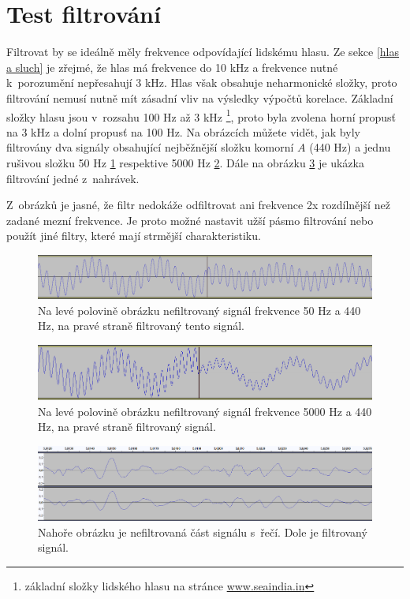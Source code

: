 \section{Test filtrování}
\label{testfilt}
Filtrovat by se ideálně měly frekvence odpovídající lidskému hlasu. Ze sekce \ref{hlas a sluch} je zřejmé, že hlas má frekvence do 10 kHz a frekvence nutné k~porozumění nepřesahují 3 kHz. Hlas však obsahuje neharmonické složky, proto filtrování nemusí nutně mít zásadní vliv na výsledky výpočtů korelace. Základní složky hlasu jsou v~rozsahu 100 Hz až 3 kHz \footnote{základní složky lidského hlasu na stránce \href{https://www.seaindia.in/human-voice-frequency-range/}{www.seaindia.in}}, proto byla zvolena horní propusť na 3 kHz a dolní propusť na 100 Hz. Na obrázcích můžete vidět, jak byly filtrovány dva signály obsahující nejběžnější složku komorní $A$ (440 Hz) a jednu rušivou složku 50 Hz \ref{pic:HPF} respektive 5000 Hz \ref{pic:LPF}. Dále na obrázku \ref{pic:BPF} je ukázka filtrování jedné z~nahrávek.

Z~obrázků je jasné, že filtr nedokáže odfiltrovat ani frekvence 2x rozdílnější než zadané mezní frekvence. Je proto možné nastavit užší pásmo filtrování nebo použít jiné filtry, které mají strmější charakteristiku.

\begin{figure}[h]
	\centering
	\includegraphics[width=1\textwidth]{obrazky-figures/filtHPF.png}
	\caption{Na levé polovině obrázku nefiltrovaný signál frekvence 50 Hz a 440 Hz, na pravé straně filtrovaný tento signál.}
	\label{pic:HPF}
\end{figure}

\begin{figure}[!h]
	\centering
	\includegraphics[width=1\textwidth]{obrazky-figures/filtLPF.png}
	\caption{Na levé polovině obrázku nefiltrovaný signál frekvence 5000 Hz a 440 Hz, na pravé straně filtrovaný signál.}
	\label{pic:LPF}
\end{figure}

\begin{figure}[!h]
	\centering
	\includegraphics[width=1\textwidth]{obrazky-figures/filtRec.png}
	\caption{Nahoře obrázku je nefiltrovaná část signálu s~řečí. Dole je filtrovaný signál.}
	\label{pic:BPF}
\end{figure}

